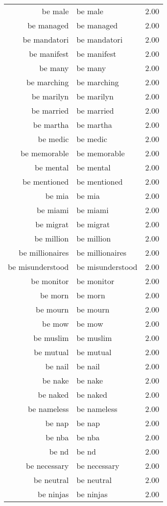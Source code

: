 \begin{table}[ht]
\begin{tabular}{rlr}
  be male & be male & 2.00 \\ 
  be managed & be managed & 2.00 \\ 
  be mandatori & be mandatori & 2.00 \\ 
  be manifest & be manifest & 2.00 \\ 
  be many & be many & 2.00 \\ 
  be marching & be marching & 2.00 \\ 
  be marilyn & be marilyn & 2.00 \\ 
  be married & be married & 2.00 \\ 
  be martha & be martha & 2.00 \\ 
  be medic & be medic & 2.00 \\ 
  be memorable & be memorable & 2.00 \\ 
  be mental & be mental & 2.00 \\ 
  be mentioned & be mentioned & 2.00 \\ 
  be mia & be mia & 2.00 \\ 
  be miami & be miami & 2.00 \\ 
  be migrat & be migrat & 2.00 \\ 
  be million & be million & 2.00 \\ 
  be millionaires & be millionaires & 2.00 \\ 
  be misunderstood & be misunderstood & 2.00 \\ 
  be monitor & be monitor & 2.00 \\ 
  be morn & be morn & 2.00 \\ 
  be mourn & be mourn & 2.00 \\ 
  be mow & be mow & 2.00 \\ 
  be muslim & be muslim & 2.00 \\ 
  be mutual & be mutual & 2.00 \\ 
  be nail & be nail & 2.00 \\ 
  be nake & be nake & 2.00 \\ 
  be naked & be naked & 2.00 \\ 
  be nameless & be nameless & 2.00 \\ 
  be nap & be nap & 2.00 \\ 
  be nba & be nba & 2.00 \\ 
  be nd & be nd & 2.00 \\ 
  be necessary & be necessary & 2.00 \\ 
  be neutral & be neutral & 2.00 \\ 
  be ninjas & be ninjas & 2.00 \\ 

\end{tabular}
\end{table}
